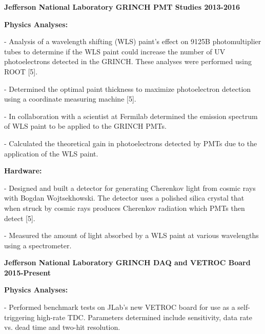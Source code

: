 \documentclass[letterpaper,10pt]{article}
\renewenvironment{itemize}{
  \begin{list}{}{
    \setlength{\leftmargin}{1.5em}
  }
}{
  \end{list}
}
\begin{document}
{\begin{itemize}
\begin{itemize}
\end{itemize}

\item {\large {\bf Jefferson National Laboratory GRINCH PMT Studies 2013-2016} }

 \begin{itemize}\itemsep1pt \parskip0pt 
  \item \textbf{Physics Analyses:}
   
    \begin{itemize}\itemsep1pt \parskip0pt 
     \item - Analysis of a wavelength shifting (WLS) paint's effect on 9125B photomultiplier tubes to determine if the WLS paint could increase the number of UV photoelectrons detected in the GRINCH. These analyses were performed using ROOT [5]. 
     \item - Determined the optimal paint thickness to maximize photoelectron detection using a coordinate measuring machine [5].
     \item - In collaboration with a scientist at Fermilab determined the emission spectrum of WLS paint to be applied to the GRINCH PMTs.
     \item - Calculated the theoretical gain in photoelectrons detected by PMTs due to the application of the WLS paint. 
     \end{itemize}

  \item \textbf{Hardware:}
    \begin{itemize}\itemsep1pt \parskip0pt 
     \item - Designed and built a detector for generating Cherenkov light from cosmic rays with Bogdan Wojtsekhowski. The detector uses a polished silica crystal that when struck by cosmic rays produces Cherenkov radiation which PMTs then detect [5]. 
     \item - Measured the amount of light absorbed by a WLS paint at various wavelengths using a spectrometer. 
    \end{itemize}
 \end{itemize}
 
\item {\large {\bf Jefferson National Laboratory GRINCH DAQ and VETROC Board 2015-Present} }

 \begin{itemize}\itemsep1pt \parskip0pt 
  \item \textbf{Physics Analyses:}
    \begin{itemize}\itemsep1pt \parskip0pt 
     \item - Performed benchmark tests on JLab's new VETROC board for use as a self-triggering high-rate TDC. Parameters determined include sensitivity, data rate vs. dead time and two-hit resolution.
     \end{itemize}


\end{itemize}
\end{itemize}}
\end{document}
